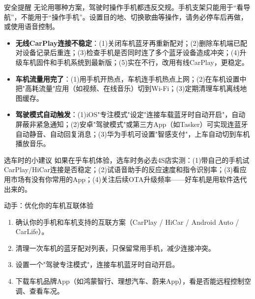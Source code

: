 \begin{tcbwarn}{安全提醒}
无论用哪种方案，驾驶时操作手机都违反交规。手机支架只能用于“看导航”，不能用于“操作手机”。设置目的地、切换歌曲等操作，请务必停车后再做，或使用语音控制。

\end{tcbwarn}


\begin{itemize}
  \item \textbf{无线CarPlay连接不稳定}：(1)关闭车机蓝牙再重新配对；(2)删除车机端已配对设备记录后重连；(3)检查手机是否同时连了多个蓝牙设备造成冲突；(4)升级车机固件和手机系统到最新版；(5)实在不行，改用有线CarPlay，更稳定。
  \item \textbf{车机流量用完了}：(1)用手机开热点，车机连手机热点上网；(2)在车机设置中把"高耗流量"应用（如视频、在线音乐）切到Wi-Fi；(3)定期清理车机离线地图缓存。
  \item \textbf{驾驶模式自动触发}：(1)iOS"专注模式"设定"连接车载蓝牙时自动开启"，自动屏蔽非紧急通知；(2)安卓"驾驶模式"或第三方App（如Tasker）可实现连蓝牙自动静音、自动回复消息；(3)华为手机可设置"智感支付"，上车自动切到车机播放音乐。
\end{itemize}

\begin{tcbinfo}{选车时的小建议}
如果在乎车机体验，选车时务必去4S店实测：(1)带自己的手机试CarPlay/HiCar连接是否稳定；(2)试语音助手的反应速度和指令识别率；(3)看应用市场有没有你常用的App；(4)关注后续OTA升级频率——好车机是用软件迭代出来的。

\end{tcbinfo}

\begin{tcbpractice}{动手：优化你的车机互联体验}
\begin{enumerate}
  \item 确认你的手机和车机支持的互联方案（CarPlay / HiCar / Android Auto / CarLife）。
  \item 清理一次车机的蓝牙配对列表，只保留常用手机，减少连接冲突。
  \item 设置一个"驾驶专注模式"，连接车机蓝牙时自动开启。
  \item 下载车机品牌App（如鸿蒙智行、理想汽车、蔚来App），看是否能远程控制空调、查看车况。
\end{enumerate}

\end{tcbpractice}


